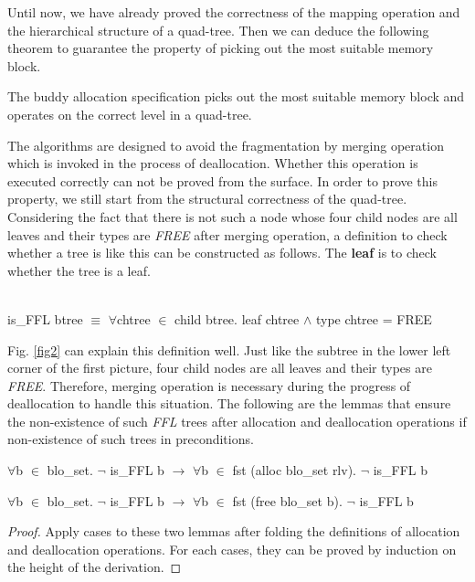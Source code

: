 \documentclass[runningheads]{llncs}
\begin{document}
Until now, we have already proved the correctness of the mapping operation and the hierarchical structure of a quad-tree. Then we can deduce the following theorem to guarantee the property of picking out the most suitable memory block.

\begin{theorem}
The buddy allocation specification picks out the most suitable memory block and operates on the correct level in a quad-tree.
\end{theorem}

The algorithms are designed to avoid the fragmentation by merging operation which is invoked in the process of deallocation. Whether this operation is executed correctly can not be proved from the surface. In order to prove this property, we still start from the structural correctness of the quad-tree. Considering the fact that there is not such a node whose four child nodes are all leaves and their types are \emph{FREE} after merging operation, a definition to check whether a tree is like this can be constructed as follows. The \textbf{leaf} is to check whether the tree is a leaf.

\begin{definition}  \\
is\_FFL btree $\equiv$ $\forall$chtree $\in$ child btree. leaf chtree $\wedge$ type chtree = FREE
\end{definition}

Fig. \ref{fig2} can explain this definition well. Just like the subtree in the lower left corner of the first picture, four child nodes are all leaves and their types are \emph{FREE}. Therefore, merging operation is necessary during the progress of deallocation to handle this situation. The following are the lemmas that ensure the non-existence of such \emph{FFL} trees after allocation and deallocation operations if non-existence of such trees in preconditions.

\begin{lemma}
$\forall$b $\in$ blo\_set. $\neg$ is\_FFL b $\longrightarrow$ $\forall$b $\in$ fst (alloc blo\_set rlv). $\neg$ is\_FFL b
\end{lemma}

\begin{lemma}
$\forall$b $\in$ blo\_set. $\neg$ is\_FFL b $\longrightarrow$ $\forall$b $\in$ fst (free blo\_set b). $\neg$ is\_FFL b
\end{lemma}

\begin{proof}
Apply cases to these two lemmas after folding the definitions of allocation and deallocation operations. For each cases, they can be proved by induction on the height of the derivation.
\end{proof}
\end{document}
